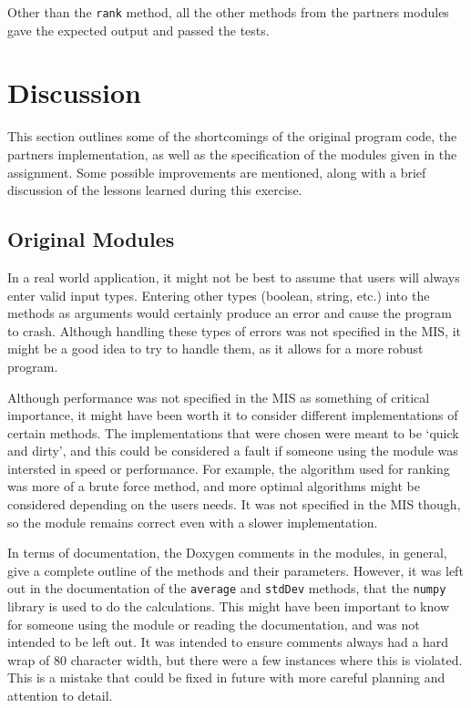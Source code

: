 \documentclass[12pt]{article}
\begin{document}
Other than the {\tt rank} method, all the other methods from the partners modules gave the expected output and passed the tests. 

\section{Discussion}

This section outlines some of the shortcomings of the original program code, the partners implementation, as well as the specification of the modules given in the assignment. Some possible improvements are mentioned, along with a brief discussion of the lessons learned during this exercise. 

\subsection{Original Modules}

In a real world application, it might not be best to assume that users will always enter valid input types. Entering other types (boolean, string, etc.) into the methods as arguments would certainly produce an error and cause the program to crash. Although handling these types of errors was not specified in the MIS, it might be a good idea to try to handle them, as it allows for a more robust program. 

Although performance was not specified in the MIS as something of critical importance, it might have been worth it to consider different implementations of certain methods. The implementations that were chosen were meant to be `quick and dirty', and this could be considered a fault if someone using the module was intersted in speed or performance. For example, the algorithm used for ranking was more of a brute force method, and more optimal algorithms might be considered depending on the users needs. It was not specified in the MIS though, so the module remains correct even with a slower implementation.

In terms of documentation, the Doxygen comments in the modules, in general, give a complete outline of the methods and their parameters. However, it was left out in the documentation of the {\tt average} and {\tt stdDev} methods, that the {\tt numpy} library is used to do the calculations. This might have been important to know for someone using the module or reading the documentation, and was not intended to be left out. It was intended to ensure comments always had a hard wrap of 80 character width, but there were a few instances where this is violated. This is a mistake that could be fixed in future with more careful planning and attention to detail.
\end{document}
